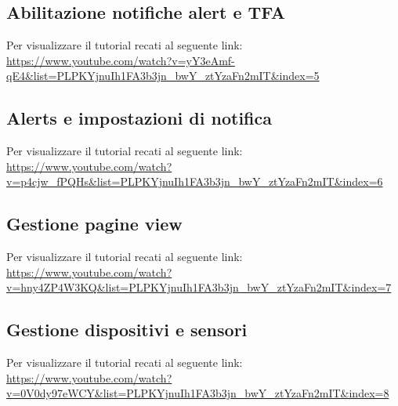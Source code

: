 \subsection{Abilitazione notifiche alert e TFA}
Per visualizzare il tutorial recati al seguente link: 
\url{https://www.youtube.com/watch?v=yY3eAmf-qE4&list=PLPKYjnuIh1FA3b3jn_bwY_ztYzaFn2mIT&index=5}

\subsection{Alerts e impostazioni di notifica}
Per visualizzare il tutorial recati al seguente link: 
\url{https://www.youtube.com/watch?v=p4cjw_fPQHs&list=PLPKYjnuIh1FA3b3jn_bwY_ztYzaFn2mIT&index=6}

\subsection{Gestione pagine view}
Per visualizzare il tutorial recati al seguente link: 
\url{https://www.youtube.com/watch?v=hny4ZP4W3KQ&list=PLPKYjnuIh1FA3b3jn_bwY_ztYzaFn2mIT&index=7}

\subsection{Gestione dispositivi e sensori}
Per visualizzare il tutorial recati al seguente link: 
\url{https://www.youtube.com/watch?v=0V0dy97eWCY&list=PLPKYjnuIh1FA3b3jn_bwY_ztYzaFn2mIT&index=8}

